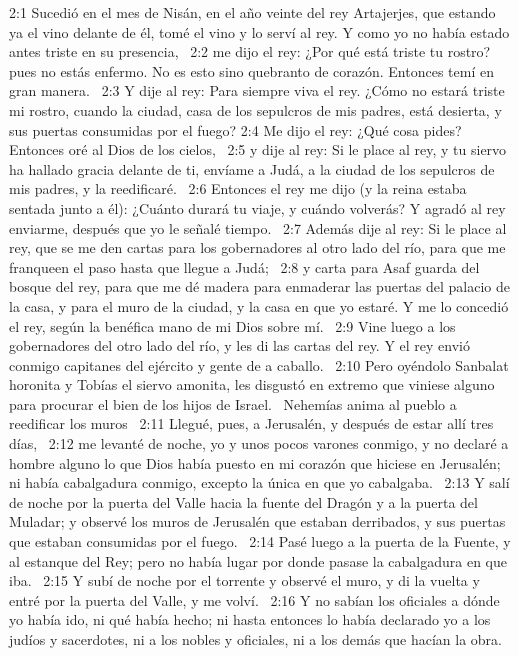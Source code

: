 2:1 Sucedió en el mes de Nisán, en el año veinte del rey Artajerjes, que estando ya el vino delante de él, tomé el vino y lo serví al rey. Y como yo no había estado antes triste en su presencia,  
2:2 me dijo el rey: ¿Por qué está triste tu rostro? pues no estás enfermo. No es esto sino quebranto de corazón. Entonces temí en gran manera.  
2:3 Y dije al rey: Para siempre viva el rey. ¿Cómo no estará triste mi rostro, cuando la ciudad, casa de los sepulcros de mis padres, está desierta, y sus puertas consumidas por el fuego? 
2:4 Me dijo el rey: ¿Qué cosa pides? Entonces oré al Dios de los cielos,  
2:5 y dije al rey: Si le place al rey, y tu siervo ha hallado gracia delante de ti, envíame a Judá, a la ciudad de los sepulcros de mis padres, y la reedificaré.  
2:6 Entonces el rey me dijo (y la reina estaba sentada junto a él): ¿Cuánto durará tu viaje, y cuándo volverás? Y agradó al rey enviarme, después que yo le señalé tiempo.  
2:7 Además dije al rey: Si le place al rey, que se me den cartas para los gobernadores al otro lado del río, para que me franqueen el paso hasta que llegue a Judá;  
2:8 y carta para Asaf guarda del bosque del rey, para que me dé madera para enmaderar las puertas del palacio de la casa, y para el muro de la ciudad, y la casa en que yo estaré. Y me lo concedió el rey, según la benéfica mano de mi Dios sobre mí.  
2:9 Vine luego a los gobernadores del otro lado del río, y les di las cartas del rey. Y el rey envió conmigo capitanes del ejército y gente de a caballo.  
2:10 Pero oyéndolo Sanbalat horonita y Tobías el siervo amonita, les disgustó en extremo que viniese alguno para procurar el bien de los hijos de Israel.  
Nehemías anima al pueblo a reedificar los muros  
2:11 Llegué, pues, a Jerusalén, y después de estar allí tres días,  
2:12 me levanté de noche, yo y unos pocos varones conmigo, y no declaré a hombre alguno lo que Dios había puesto en mi corazón que hiciese en Jerusalén; ni había cabalgadura conmigo, excepto la única en que yo cabalgaba.  
2:13 Y salí de noche por la puerta del Valle hacia la fuente del Dragón y a la puerta del Muladar; y observé los muros de Jerusalén que estaban derribados, y sus puertas que estaban consumidas por el fuego.  
2:14 Pasé luego a la puerta de la Fuente, y al estanque del Rey; pero no había lugar por donde pasase la cabalgadura en que iba.  
2:15 Y subí de noche por el torrente y observé el muro, y di la vuelta y entré por la puerta del Valle, y me volví.  
2:16 Y no sabían los oficiales a dónde yo había ido, ni qué había hecho; ni hasta entonces lo había declarado yo a los judíos y sacerdotes, ni a los nobles y oficiales, ni a los demás que hacían la obra.  
